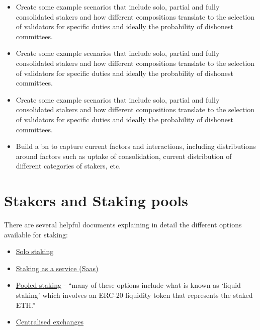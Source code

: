 \documentclass{article}
\begin{document}
\begin{itemize}
  \item Create some example scenarios that include solo, partial and fully
    consolidated stakers and how different compositions translate to the
    selection of validators for specific duties and ideally the probability of
    dishonest committees.

  \item Create some example scenarios that include solo, partial and fully
    consolidated stakers and how different compositions translate to the
    selection of validators for specific duties and ideally the probability of
    dishonest committees.

  \item Create some example scenarios that include solo, partial and fully
    consolidated stakers and how different compositions translate to the
    selection of validators for specific duties and ideally the probability of
    dishonest committees.

  \item Build a \gls{bn} to capture current factors and interactions, including
    distributions around factors such as uptake of consolidation, current
    distribution of different categories of stakers, etc.
\end{itemize}



\section{Stakers and Staking pools}
\label{sec:stakers}
There are several helpful documents explaining in detail the different options
available for staking:
\begin{itemize}
  \item \href{https://ethereum.org/en/staking/solo/}{Solo staking}
    \cite{efsolo}
  \item \href{https://ethereum.org/en/staking/saas/}{Staking as a service
    (Saas)} \cite{efsaas}
  \item \href{https://ethereum.org/en/staking/pools/}{Pooled staking} - ``many
    of these options include what is known as `liquid staking' which involves
    an ERC-20 liquidity token that represents the staked ETH.'' \cite{efpools} 
  \item \href{https://ethereum.org/en/staking/}{Centralised exchanges}
    \cite{efstaking}
\end{itemize}
\end{document}
